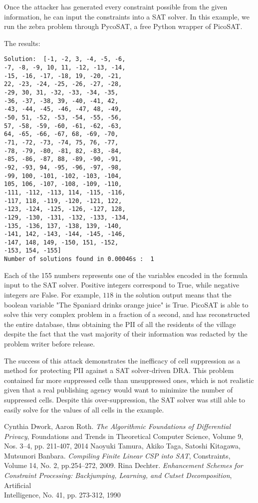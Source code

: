 \documentclass[jou,apacite]{apa6}
\begin{document}
Once the attacker has generated every constraint possible from the given information, he can input the constraints into a SAT solver. In this example, we run the zebra problem through PycoSAT, a free Python wrapper of PicoSAT.

The results:

\begin{verbatim}
Solution:  [-1, -2, 3, -4, -5, -6,
-7, -8, -9, 10, 11, -12, -13, -14,
-15, -16, -17, -18, 19, -20, -21,
22, -23, -24, -25, -26, -27, -28,
-29, 30, 31, -32, -33, -34, -35,
-36, -37, -38, 39, -40, -41, 42,
-43, -44, -45, -46, -47, 48, -49,
-50, 51, -52, -53, -54, -55, -56,
57, -58, -59, -60, -61, -62, -63,
64, -65, -66, -67, 68, -69, -70,
-71, -72, -73, -74, 75, 76, -77,
-78, -79, -80, -81, 82, -83, -84,
-85, -86, -87, 88, -89, -90, -91,
-92, -93, 94, -95, -96, -97, -98,
-99, 100, -101, -102, -103, -104,
105, 106, -107, -108, -109, -110,
-111, -112, -113, 114, -115, -116,
-117, 118, -119, -120, -121, 122,
-123, -124, -125, -126, -127, 128,
-129, -130, -131, -132, -133, -134,
-135, -136, 137, -138, 139, -140,
-141, 142, -143, -144, -145, -146,
-147, 148, 149, -150, 151, -152,
-153, 154, -155]
Number of solutions found in 0.00046s :  1
\end{verbatim}

Each of the 155 numbers represents one of the variables encoded in the formula input to the SAT solver.
Positive integers correspond to True, while negative integers are False. For example, $118$ in the solution output means that the boolean variable "The Spaniard drinks orange juice" is True.
PicoSAT is able to solve this very complex problem in a fraction of a second, and has reconstructed the entire database, thus obtaining the PII of all the residents of the village despite the fact that the vast majority of their information was redacted by the problem writer before release.

The success of this attack demonstrates the inefficacy of
cell suppression as a method for protecting PII against
a SAT solver-driven DRA. This problem
contained far more suppressed cells than unsuppressed ones, which is not realistic given that a real publishing agency would want to minimize the number of suppressed cells. Despite this over-suppression, the SAT solver was still able to easily solve for the values of all cells in the example.


\begin{thebibliography}{1}
 Cynthia Dwork, Aaron Roth.
\textit{The Algorithmic Foundations of Differential Privacy}, Foundations and Trends in Theoretical Computer Science, Volume 9, Nos. 3--4, pp. 211-407, 2014
 Naoyuki Tamura, Akiko Taga, Satoshi Kitagawa, Mutsunori Banbara.
\textit{Compiling Finite Linear CSP into SAT}, Constraints, Volume 14, No. 2, pp.254--272, 2009.
 Rina Dechter.
\textit{Enhancement Schemes for Constraint Processing: Backjumping, Learning, and Cutset Decomposition}, Artificial\\ Intelligence, No. 41, pp. 273-312, 1990
\end{thebibliography}
\end{document}
